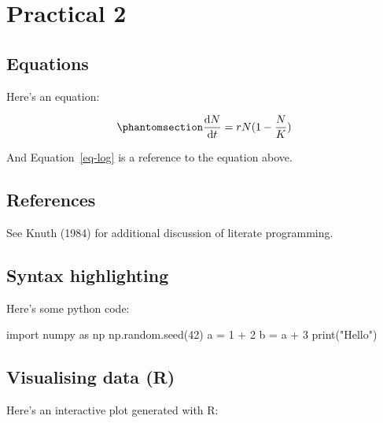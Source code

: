 \documentclass[
  letterpaper,
  DIV=11,
  numbers=noendperiod]{scrreprt}
\newenvironment{Shaded}{\begin{snugshade}}{\end{snugshade}}
\newcommand{\BuiltInTok}[1]{\textcolor[rgb]{0.00,0.23,0.31}{#1}}
\newcommand{\DecValTok}[1]{\textcolor[rgb]{0.68,0.00,0.00}{#1}}
\newcommand{\ImportTok}[1]{\textcolor[rgb]{0.00,0.46,0.62}{#1}}
\newcommand{\NormalTok}[1]{\textcolor[rgb]{0.00,0.23,0.31}{#1}}
\newcommand{\OperatorTok}[1]{\textcolor[rgb]{0.37,0.37,0.37}{#1}}
\newcommand{\StringTok}[1]{\textcolor[rgb]{0.13,0.47,0.30}{#1}}
\theoremstyle{definition}
\theoremstyle{remark}
\begin{document}
\chapter{Practical 2}\label{practical-2}

\section{Equations}\label{equations-3}

Here's an equation:

\begin{equation}\phantomsection\label{eq-log}{ 
\frac{\mathrm{d}N}{\mathrm{d}t} = rN(1 - \frac{N}{K}) 
}\end{equation}

And Equation~\ref{eq-log} is a reference to the equation above.

\section{References}\label{references-3}

See Knuth (1984) for additional discussion of literate programming.

\section{Syntax highlighting}\label{syntax-highlighting-3}

Here's some python code:

\begin{Shaded}
\begin{Highlighting}[]
\ImportTok{import}\NormalTok{ numpy }\ImportTok{as}\NormalTok{ np}
\NormalTok{np.random.seed(}\DecValTok{42}\NormalTok{)}
\NormalTok{a }\OperatorTok{=} \DecValTok{1} \OperatorTok{+} \DecValTok{2}
\NormalTok{b }\OperatorTok{=}\NormalTok{ a }\OperatorTok{+} \DecValTok{3}
\BuiltInTok{print}\NormalTok{(}\StringTok{"Hello"}\NormalTok{)}
\end{Highlighting}
\end{Shaded}

\section{Visualising data (R)}\label{visualising-data-r-3}

Here's an interactive plot generated with R:
\end{document}
